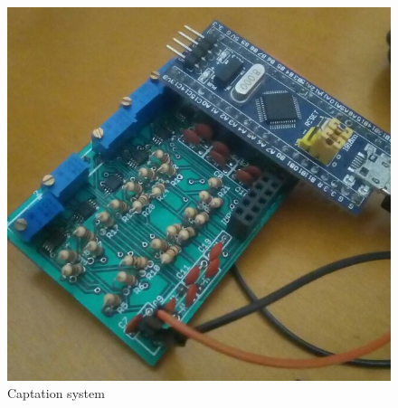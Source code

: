 \begin{figure}[!htpb]
\centering
\caption{Captation system}
\label{HW-pcb}
\includegraphics[scale=0.5]{images/INA/Hw-pcb}
\end{figure}
